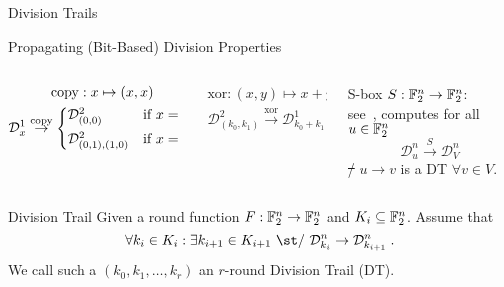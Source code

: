 \begin{frame}{Division Trails}
    \begin{block}{Propagating (Bit-Based) Division Properties}
        \vspace*{5pt}
        \begin{columns}
        \begin{column}{0.3\textwidth}
            \vspace*{-10pt}
            \begin{gather*}
                \mathrm{copy} : x \mapsto (x, x) \\
                \mathcal{D}^1_x \stackrel{\mathrm{copy}}{\to} \begin{cases*}
                    \mathcal{D}^2_{(0,0)}       & if $x = 0$ \\
                    \mathcal{D}^2_{(0,1),(1,0)} & if $x = 1$
                \end{cases*}
            \end{gather*}
            \vspace*{-3pt}
        \end{column}
        \begin{column}{0.3\textwidth}
            \vspace*{-10pt}
            \begin{gather*}
                \mathrm{xor} : (x,y) \mapsto x + y \\
                \mathcal{D}^{2}_{(k_0,k_1)} \stackrel{\mathrm{xor}}{\to} \mathcal{D}^1_{k_0+k_1}
            \end{gather*}
        \end{column}
        \pause
        \begin{column}{0.3\textwidth}
            \centering
            S-box $S : \mathbb{F}_2^n \to \mathbb{F}_2^n$:\\
            see~\cite[Algorithm~2]{AC:XZBL16},
            computes for all $u \in \mathbb{F}_2^n$\\
            \vspace*{-15pt}
            \begin{equation*}
                \mathcal{D}^{n}_{u} \stackrel{S}{\to} \mathcal{D}^{n}_V
            \end{equation*}
            \st/ $u \to v$ is a DT $\forall v \in V$.
        \end{column}
        \end{columns}
        \vspace*{5pt}
    \end{block}
    \pause
    \begin{block}{Division Trail}
        Given a round function $F : \mathbb{F}_2^n \to \mathbb{F}_2^n$ and $K_i \subseteq \mathbb{F}_2^n$.
        Assume that
        \begin{equation*}
            \forall k_i \in K_i: \exists k_{i+1} \in K_{i+1}\ \text{\st/}\ \mathcal{D}^n_{k_i} \to \mathcal{D}^n_{k_{i+1}}\;.
        \end{equation*}
        We call such a $(k_0, k_1, \ldots, k_r)$ an $r$-round Division Trail (DT).
    \end{block}
\end{frame}

